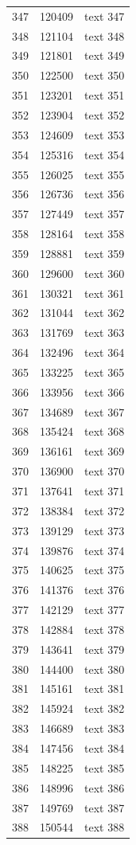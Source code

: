 \documentclass[10pt]{article}
\begin{document}
\begin{longtable}{rrl}
347&120409&text 347\\
348&121104&text 348\\
349&121801&text 349\\
350&122500&text 350\\
351&123201&text 351\\
352&123904&text 352\\
353&124609&text 353\\
354&125316&text 354\\
355&126025&text 355\\
356&126736&text 356\\
357&127449&text 357\\
358&128164&text 358\\
359&128881&text 359\\
360&129600&text 360\\
361&130321&text 361\\
362&131044&text 362\\
363&131769&text 363\\
364&132496&text 364\\
365&133225&text 365\\
366&133956&text 366\\
367&134689&text 367\\
368&135424&text 368\\
369&136161&text 369\\
370&136900&text 370\\
371&137641&text 371\\
372&138384&text 372\\
373&139129&text 373\\
374&139876&text 374\\
375&140625&text 375\\
376&141376&text 376\\
377&142129&text 377\\
378&142884&text 378\\
379&143641&text 379\\
380&144400&text 380\\
381&145161&text 381\\
382&145924&text 382\\
383&146689&text 383\\
384&147456&text 384\\
385&148225&text 385\\
386&148996&text 386\\
387&149769&text 387\\
388&150544&text 388\\

\end{longtable}
\end{document}
